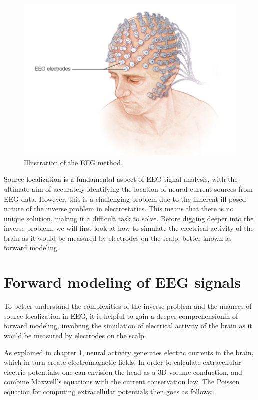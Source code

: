\documentclass[a4paper, UKenglish, 11pt]{uiomaster}
\begin{document}
\begin{figure}[!htb]
    \centering
    \includegraphics[width=\linewidth]{figures/EEG_fig.png}
    \caption{Illustration of the EEG method.}
    \label{fig:EEG}
\end{figure}


Source localization is a fundamental aspect of EEG signal analysis, with the ultimate aim of accurately identifying the location of neural current sources from EEG data. However, this is a challenging problem due to the inherent ill-posed nature of the inverse problem in electrostatics. This means that there is no unique solution, making it a difficult task to solve. Before digging deeper into the inverse problem, we will first look at how to simulate the electrical activity of the brain as it would be measured by electrodes on the scalp, better known as forward modeling.

\section{Forward modeling of EEG signals}
To better understand the complexities of the inverse problem and the nuances of source localization in EEG, it is helpful to gain a deeper comprehensionin of forward modeling, involving the simulation of electrical activity of the brain as it would be measured by electrodes on the scalp.

As explained in chapter 1, neural activity generates electric currents in the brain, which in turn create electromagnetic fields. In order to calculate extracellular electric potentials, one can envision the head as a 3D volume conduction, and combine Maxwell's equations with the current conservation law. The Poisson equation for computing extracellular potentials then goes as follows:
\end{document}
